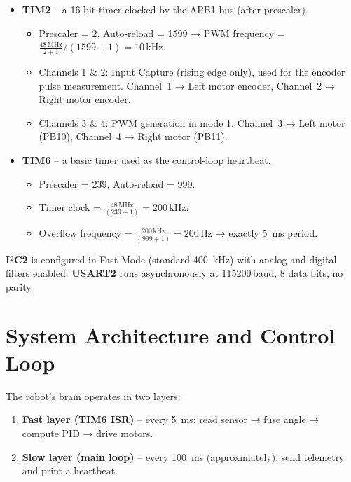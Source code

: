 \documentclass[12pt,a4paper]{article}
\begin{document}
	\begin{itemize}
		\item \textbf{TIM2} -- a 16‑bit timer clocked by the APB1 bus (after prescaler).  
		\begin{itemize}
			\item Prescaler = 2, Auto‑reload = 1599 → PWM frequency = \(\frac{48\,\text{MHz}}{2+1} / (1599+1) = 10\,\text{kHz}\).
			\item Channels 1 \& 2: Input Capture (rising edge only), used for the encoder pulse measurement.  
			Channel~1 → Left motor encoder, Channel~2 → Right motor encoder.
			\item Channels 3 \& 4: PWM generation in mode 1.  
			Channel~3 → Left motor (PB10), Channel~4 → Right motor (PB11).
		\end{itemize}
		\item \textbf{TIM6} -- a basic timer used as the control‑loop heartbeat.
		\begin{itemize}
			\item Prescaler = 239, Auto‑reload = 999.
			\item Timer clock = \(\frac{48\,\text{MHz}}{(239+1)} = 200\,\text{kHz}\).
			\item Overflow frequency = \(\frac{200\,\text{kHz}}{(999+1)} = 200\,\text{Hz}\) → exactly \SI{5}{\milli\second} period.
		\end{itemize}
	\end{itemize}
	
	\noindent\textbf{I²C2} is configured in Fast Mode (standard \SI{400}{\kilo\hertz}) with analog and digital filters enabled.  
	\textbf{USART2} runs asynchronously at 115200\,baud, 8 data bits, no parity.
	
	\section{System Architecture and Control Loop}
	\label{sec:arch}
	
	The robot’s brain operates in two layers:
	\begin{enumerate}
		\item \textbf{Fast layer (TIM6 ISR)} -- every \SI{5}{\milli\second}: read sensor → fuse angle → compute PID → drive motors.
		\item \textbf{Slow layer (main loop)} -- every \SI{100}{\milli\second} (approximately): send telemetry and print a heartbeat.
	\end{enumerate}
	
\end{document}
